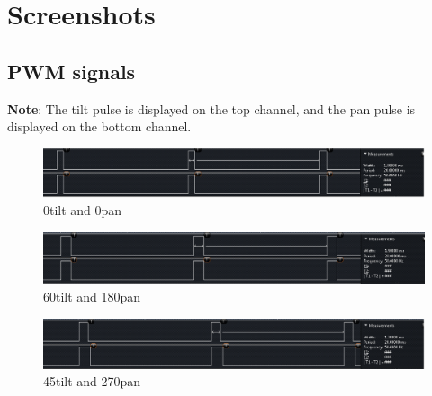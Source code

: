 \documentclass[11pt, titlepage]{article}
\begin{document}
    \section{Screenshots}
        \subsection{PWM signals}
            \textbf{Note}: The tilt pulse is displayed on the top channel, and the pan pulse is displayed on the bottom channel.
            \FloatBarrier
            \begin{figure}[htbp]
                \centering
                \includegraphics[scale = 0.6]{Screenshots/0_0_Cropped.png}
                \caption{0\degree tilt and 0\degree pan}
            \end{figure}
            \FloatBarrier
            
            \FloatBarrier
            \begin{figure}[htbp]
                \centering
                \includegraphics[scale = 0.6]{Screenshots/60_180_Cropped.png}
                \caption{60\degree tilt and 180\degree pan}
            \end{figure}
            \FloatBarrier
            
            \FloatBarrier
            \begin{figure}[htbp]
                \centering
                \includegraphics[scale = 0.6]{Screenshots/45_270_Cropped.png}
                \caption{45\degree tilt and 270\degree pan}
            \end{figure}
            \FloatBarrier
        
\end{document}
